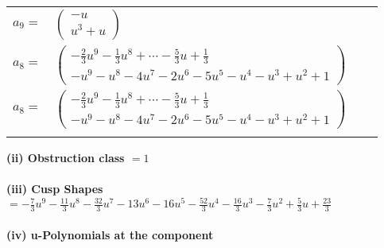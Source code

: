 \documentclass[1p]{elsarticle_modified}
\theoremstyle{definition}
\begin{document}
\begin{tabular}{m{7pt} m{180pt} m{7pt} m{180pt} }
\flushright $a_{9}=$&$\begin{pmatrix}- u\\u^3+u\end{pmatrix}$ \\
\flushright $a_{8}=$&$\begin{pmatrix}-\frac{2}{3} u^9-\frac{1}{3} u^8+\cdots-\frac{5}{3} u+\frac{1}{3}\\- u^9- u^8-4 u^7-2 u^6-5 u^5- u^4- u^3+u^2+1\end{pmatrix}$\\ \flushright $a_{8}=$&$\begin{pmatrix}-\frac{2}{3} u^9-\frac{1}{3} u^8+\cdots-\frac{5}{3} u+\frac{1}{3}\\- u^9- u^8-4 u^7-2 u^6-5 u^5- u^4- u^3+u^2+1\end{pmatrix}$\\&\end{tabular}
\flushleft \textbf{(ii) Obstruction class $= 1$}\\~\\
\flushleft \textbf{(iii) Cusp Shapes $= -\frac{7}{3} u^9-\frac{11}{3} u^8-\frac{32}{3} u^7-13 u^6-16 u^5-\frac{52}{3} u^4-\frac{16}{3} u^3-\frac{7}{3} u^2+\frac{5}{3} u+\frac{23}{3}$}\\~\\
\newpage\renewcommand{\arraystretch}{1}
\flushleft \textbf{(iv) u-Polynomials at the component}\newline \\
\end{document}

